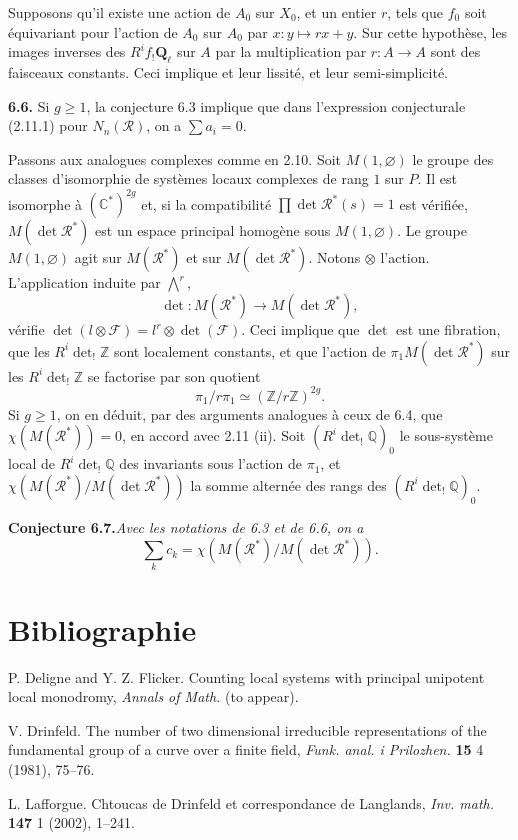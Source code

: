 \documentclass[11pt]{article}
\newcommand{\Ql}{\mathbf{Q}_{\ell}}
\newcommand{\Q}{\mathbb{Q}}
\newcommand{\Z}{\mathbb{Z}}
\newcommand{\C}{\mathbb{C}}
\newcommand{\para}[1]{\medskip\noindent\textbf{#1}\enspace}
\begin{document}
Supposons qu'il existe une action de \(A_0\) sur \(X_0\), et un entier \(r\), tels que \(f_0\) soit équivariant pour l'action de \(A_0\) sur \(A_0\) par \(x:y\mapsto rx+y\). Sur cette hypothèse, les images inverses des \(R^if_!\Ql\) sur \(A\) par la multiplication par \(r:A\to A\) sont des faisceaux constants. Ceci implique et leur lissité, et leur semi-simplicité.

\para{6.6.} Si \(g\geq 1\), la conjecture 6.3 implique que dans l'expression conjecturale (2.11.1) pour \(N_n(\mathcal R)\), on a \(\sum a_i=0\).

Passons aux analogues complexes comme en 2.10. Soit \(M(1,\varnothing)\) le groupe des classes d'isomorphie de systèmes locaux complexes de rang \(1\) sur \(P\). Il est isomorphe à \((\C^*)^{2g}\) et, si la compatibilité \(\prod\det \mathcal R^*(s)=1\) est vérifiée, \(M(\det\mathcal R^*)\) est un espace principal homogène sous \(M(1,\varnothing)\). Le groupe \(M(1,\varnothing)\) agit sur \(M(\mathcal R^*)\) et sur \(M(\det\mathcal R^*)\). Notons \(\otimes\) l'action. L'application induite par \(\bigwedge^r\),
\[
  \det:M(\mathcal R^*)\longrightarrow M(\det\mathcal R^*),
\]
vérifie \(\det(l\otimes\mathcal F)=l^r\otimes\det(\mathcal F)\). Ceci implique que \(\det\) est une fibration, que les \(R^i\det_!\Z\) sont localement constants, et que l'action de \(\pi_1M(\det\mathcal R^*)\) sur les \(R^i\det_!\Z\) se factorise par son quotient
\[
  \pi_1/r\pi_1\simeq(\Z/r\Z)^{2g}.
\]
Si \(g\geq 1\), on en déduit, par des arguments analogues à ceux de 6.4, que \(\chi(M(\mathcal R^*))=0\), en accord avec 2.11 (ii). Soit \((R^i\det_!\Q)_0\) le sous-système local de \(R^i\det_!\Q\) des invariants sous l'action de \(\pi_1\), et \(\chi(M(\mathcal R^*)/M(\det\mathcal R^*))\) la somme alternée des rangs des \((R^i\det_!\Q)_0\).

\noindent\textbf{Conjecture 6.7.}\quad\textit{Avec les notations de 6.3 et de 6.6, on a}
\[
  \sum_k c_k=\chi(M(\mathcal R^*)/M(\det\mathcal R^*)).
\]

\section*{Bibliographie}

\begin{description}[leftmargin=2.6em,labelwidth=2.1em,labelsep=0.5em]
\item[{[DF]}] P. Deligne and Y. Z. Flicker. Counting local systems with principal unipotent local monodromy, \emph{Annals of Math.} (to appear).

\item[{[Dr]}] V. Drinfeld. The number of two dimensional irreducible representations of the fundamental group of a curve over a finite field, \emph{Funk. anal. i Prilozhen.} \textbf{15} 4 (1981), 75--76.

\item[{[L]}] L. Lafforgue. Chtoucas de Drinfeld et correspondance de Langlands, \emph{Inv. math.} \textbf{147} 1 (2002), 1--241.
\end{description}
\end{document}

